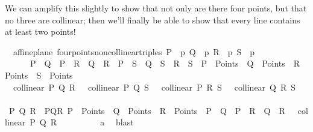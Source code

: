 \begin{isabellebody}
%
\begin{isamarkuptext}%
We can amplify this slightly to show that not only are there four points, but that no 
three are collinear; then we'll finally be able to show that every line contains at least two points!%
\end{isamarkuptext}\isamarkuptrue%
\isamarkupfalse%
\ {\isacharparenleft}{\kern0pt}\ affine{\isacharunderscore}{\kern0pt}plane{\isacharparenright}{\kern0pt}\ four{\isacharunderscore}{\kern0pt}points{\isacharunderscore}{\kern0pt}noncollinear{\isacharunderscore}{\kern0pt}triples{\isacharcolon}{\kern0pt}\ {\isachardoublequoteopen}{\isasymexists}{\isacharparenleft}{\kern0pt}P\ {\isacharcolon}{\kern0pt}{\isacharcolon}{\kern0pt}\ {\isacharprime}{\kern0pt}p{\isacharparenright}{\kern0pt}\ {\isacharparenleft}{\kern0pt}Q\ {\isacharcolon}{\kern0pt}{\isacharcolon}{\kern0pt}\ {\isacharprime}{\kern0pt}p{\isacharparenright}{\kern0pt}\ {\isacharparenleft}{\kern0pt}R\ {\isacharcolon}{\kern0pt}{\isacharcolon}{\kern0pt}\ {\isacharprime}{\kern0pt}p{\isacharparenright}{\kern0pt}\ {\isacharparenleft}{\kern0pt}S\ {\isacharcolon}{\kern0pt}{\isacharcolon}{\kern0pt}\ {\isacharprime}{\kern0pt}p{\isacharparenright}{\kern0pt}{\isachardot}{\kern0pt}\ \isanewline
\ \ \ \ \ \ P\ {\isasymnoteq}\ Q\ {\isasymand}\ P\ {\isasymnoteq}\ R\ {\isasymand}\ Q\ {\isasymnoteq}\ R\ {\isasymand}\ P\ {\isasymnoteq}\ S\ {\isasymand}\ Q\ {\isasymnoteq}\ S\ {\isasymand}\ R\ {\isasymnoteq}\ S\ {\isasymand}\ P\ {\isasymin}\ Points\ {\isasymand}\ Q\ {\isasymin}\ Points\ {\isasymand}\ R\ {\isasymin}\ Points\ {\isasymand}\ S\ {\isasymin}\ Points\isanewline
{\isasymand}\ {\isasymnot}\ collinear\ P\ Q\ R\ {\isasymand}\ {\isasymnot}\ collinear\ P\ Q\ S\ {\isasymand}\ {\isasymnot}\ collinear\ P\ R\ S\ {\isasymand}\ {\isasymnot}\ collinear\ Q\ R\ S{\isachardoublequoteclose}\isanewline
%
\isadelimproof
\ \ \ \ %
\endisadelimproof
%
\isatagproof
{}\isamarkupfalse%
\ {\isacharminus}{\kern0pt}\isanewline
\ \ \ \ \ \ \isamarkupfalse%
\ P\ Q\ R\ \ PQR{\isacharcolon}{\kern0pt}\ {\isachardoublequoteopen}P\ {\isasymin}\ Points\ {\isasymand}\ Q\ {\isasymin}\ Points\ {\isasymand}\ R\ {\isasymin}\ Points\ {\isasymand}\ P\ {\isasymnoteq}\ Q\ {\isasymand}\ P\ {\isasymnoteq}\ R\ {\isasymand}\ Q\ {\isasymnoteq}\ R\ {\isasymand}\ {\isasymnot}\ collinear\ P\ Q\ R{\isachardoublequoteclose}\isanewline
\ \ \ \ \ \ \ \ \isamarkupfalse%
\ a{}\ \isamarkupfalse%
\ blast\isanewline
\ \ \ \ \ \ \isamarkupfalse%

\end{isabellebody}
